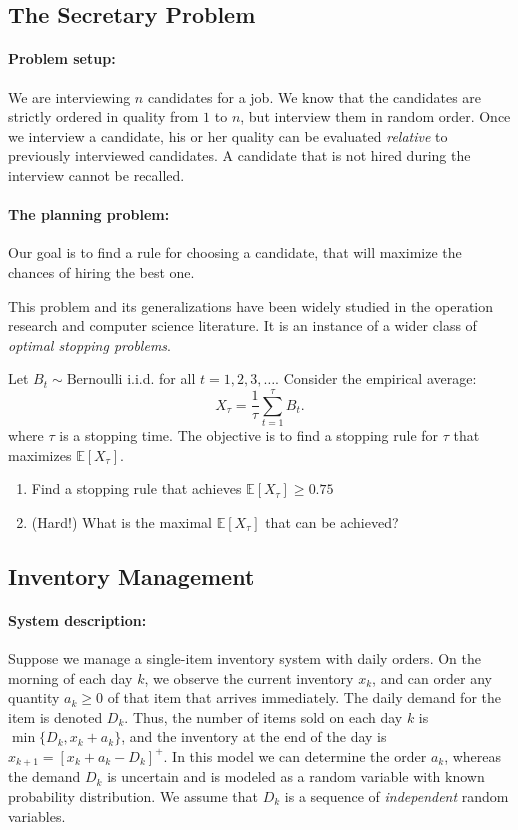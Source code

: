 \subsection{The Secretary Problem}
\paragraph{Problem setup:} We are interviewing $n$ candidates for a job. We know that the candidates are strictly ordered in quality from $1$ to $n$, but interview them in random order. Once we interview a candidate, his or her quality can be evaluated \emph{relative} to previously interviewed candidates. A candidate that is not hired during the interview cannot be recalled.
\paragraph{The planning problem:} Our goal is to find a rule for choosing a candidate, that will  maximize the chances of hiring the best one.

This problem and its generalizations have been widely studied in the operation research and computer science literature. It is an instance of a wider class of \emph{optimal stopping problems}.

\begin{exercise}
Let $B_t\sim \textrm{Bernoulli} $ i.i.d. for all $t=1,2,3,\dots$.
Consider the empirical average:
\begin{equation*}
    X_\tau = \frac{1}{\tau}\sum_{t=1}^{\tau} B_t.
\end{equation*}
where $\tau$ is a stopping time. The objective is to find a stopping rule for $\tau$ that maximizes $\mathbb E [X_\tau]$.
\begin{enumerate}
  \item Find a stopping rule that achieves $\mathbb E [X_\tau] \geq 0.75$
  \item (Hard!) What is the maximal $\mathbb E [X_\tau]$ that can be achieved?
\end{enumerate}
\end{exercise}

\subsection{Inventory Management}
\paragraph{System description:} Suppose we manage a single-item inventory system with daily orders. On the morning of each day $k$, we observe the current inventory ${x_k}$, and can order any quantity ${a_k} \ge 0$ of that item that arrives immediately. The daily demand for the item is denoted ${D_k}$. Thus, the number of items sold on each day $k$ is $\min \{ {D_k},{x_k} + {a_k}\} $, and the inventory at the end of the day is ${x_{k + 1}} = {[{x_k} + {a_k} - {D_k}]^ + }$. In this model we can determine the order $a_k$, whereas the demand $D_k$ is uncertain and is modeled as a random variable with known probability distribution. We assume that $D_k$ is a sequence of \emph{independent} random variables.

